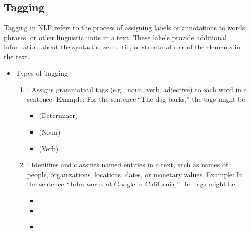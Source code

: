 \documentclass[letterpaper,11pt,english]{sphinxmanual}
\begin{document}
\subsection{Tagging}
\label{\detokenize{prelim:tagging}}
\sphinxAtStartPar
Tagging in NLP refers to the process of assigning labels or annotations
to words, phrases, or other linguistic units in a text. These labels provide additional information about
the syntactic, semantic, or structural role of the elements in the text.
\begin{itemize}
\item {} 
\sphinxAtStartPar
Types of Tagging
\begin{enumerate}
%
\item {} 
\sphinxAtStartPar
{}:
\sphinxhyphen{} Assigns grammatical tags (e.g., noun, verb, adjective) to each word in a sentence.
\sphinxhyphen{} Example: For the sentence “The dog barks,” the tags might be:
\begin{itemize}
\item {} 
\sphinxAtStartPar
{} (Determiner)

\item {} 
\sphinxAtStartPar
{} (Noun)

\item {} 
\sphinxAtStartPar
{} (Verb).

\end{itemize}

\item {} 
\sphinxAtStartPar
{}:
\sphinxhyphen{} Identifies and classifies named entities in a text, such as names of people, organizations, locations, dates, or monetary values.
\sphinxhyphen{} Example: In the sentence “John works at Google in California,” the tags might be:
\begin{itemize}
\item {} 
\sphinxAtStartPar
{}

\item {} 
\sphinxAtStartPar
{}

\item {} 
\sphinxAtStartPar
{}.

\end{itemize}


\end{enumerate}
\end{itemize}
\end{document}
